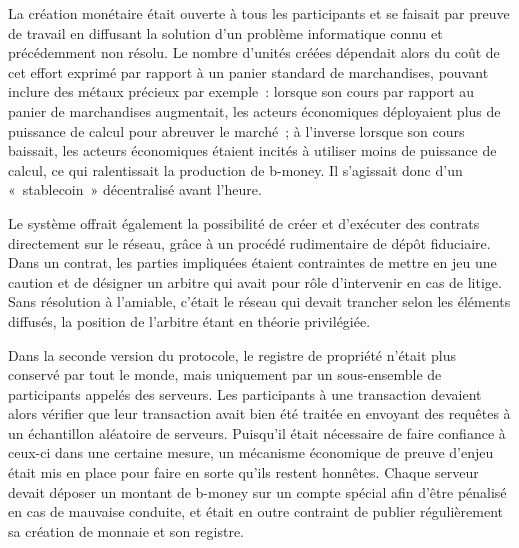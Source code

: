 La création monétaire était ouverte à tous les participants et se faisait par preuve de travail en diffusant la solution d'un problème informatique connu et précédemment non résolu. Le nombre d'unités créées dépendait alors du coût de cet effort exprimé par rapport à un panier standard de marchandises, pouvant inclure des métaux précieux par exemple~: lorsque son cours par rapport au panier de marchandises augmentait, les acteurs économiques déployaient plus de puissance de calcul pour abreuver le marché~; à l'inverse lorsque son cours baissait, les acteurs économiques étaient incités à utiliser moins de puissance de calcul, ce qui ralentissait la production de b-money. Il s'agissait donc d'un «~stablecoin~» décentralisé avant l'heure. %

Le système offrait également la possibilité de créer et d'exécuter des contrats directement sur le réseau, grâce à un procédé rudimentaire de dépôt fiduciaire. Dans un contrat, les parties impliquées étaient contraintes de mettre en jeu une caution et de désigner un arbitre qui avait pour rôle d'intervenir en cas de litige. Sans résolution à l'amiable, c'était le réseau qui devait trancher selon les éléments diffusés, la position de l'arbitre étant en théorie privilégiée.

Dans la seconde version du protocole, le registre de propriété n'était plus conservé par tout le monde, mais uniquement par un sous-ensemble de participants appelés des serveurs. Les participants à une transaction devaient alors vérifier que leur transaction avait bien été traitée en envoyant des requêtes à un échantillon aléatoire de serveurs. Puisqu'il était nécessaire de faire confiance à ceux-ci dans une certaine mesure, un mécanisme économique de preuve d'enjeu était mis en place pour faire en sorte qu'ils restent honnêtes. Chaque serveur devait déposer un montant de b-money sur un compte spécial afin d'être pénalisé en cas de mauvaise conduite, et était en outre contraint de publier régulièrement sa création de monnaie et son registre.

